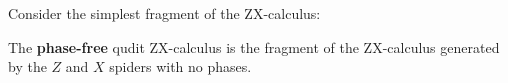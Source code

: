 Consider the simplest fragment of the ZX-calculus:
\begin{definition}
The {\bf phase-free} qudit ZX-calculus
is the fragment of the ZX-calculus generated by the $Z$ and $X$ spiders with no phases.
%
\end{definition}
